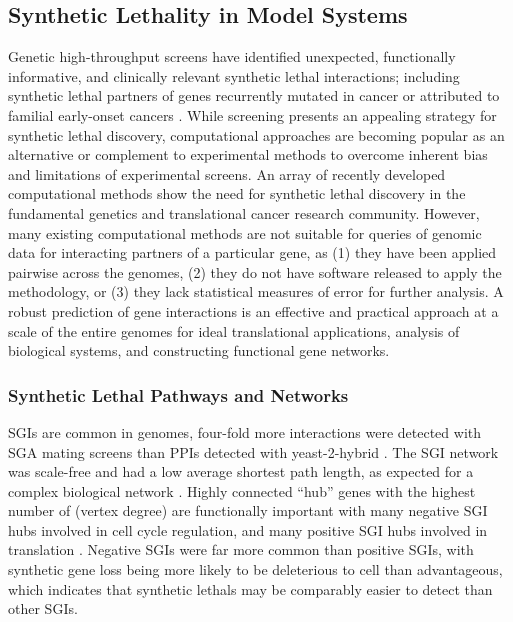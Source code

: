\subsection{Synthetic Lethality in Model Systems}
Genetic \glspl{high-throughput screen} have identified unexpected, functionally informative, and clinically relevant \gls{synthetic lethal} interactions; including \gls{synthetic lethal} partners of genes recurrently mutated in cancer or attributed to \gls{familial} early-onset cancers \citep{Lord2014}. While screening presents an appealing strategy for \gls{synthetic lethal} discovery, computational approaches are becoming popular as an alternative or complement to experimental methods to overcome inherent bias and limitations of experimental screens. An array of recently developed computational methods \citep{Wang2013, Tiong2014, Jerby2014, Lu2015, Wappett2014} show the need for \gls{synthetic lethal} discovery in the fundamental genetics and translational cancer research community. However, many existing computational methods are not suitable for queries of \gls{genomic} data for interacting partners of a particular gene, as (1) they have been applied pairwise across the \glspl{genome}, (2) they do not have software released to apply the methodology, or (3) they lack statistical measures of error for further analysis. A robust prediction of gene interactions is an effective and practical approach at a scale of the entire \glspl{genome} for ideal translational applications, analysis of biological systems, and constructing functional gene networks.

\subsubsection{Synthetic Lethal Pathways and Networks}
\glspl{SGI} are common in \glspl{genome}, four-fold more interactions were detected with \gls{SGA} mating screens than \glspl{PPI} detected with yeast-2-hybrid \citep{Tong2004}. The \gls{SGI} network was \gls{scale-free} and had a low average \gls{shortest path} length, as expected for a complex biological network \citep{Barabasi2004}. Highly connected ``hub'' genes with the highest number of  (\gls{vertex degree}) are functionally important with many negative \gls{SGI} hubs involved in cell cycle regulation, and many positive \gls{SGI} hubs involved in translation \citep{Baryshnikova2010b, Costanzo2010}. Negative \glspl{SGI} were far more common than positive \glspl{SGI}, with synthetic gene loss being more likely to be deleterious to cell than advantageous, which indicates that \glspl{synthetic lethal} may be comparably easier to detect than other \glspl{SGI}. 

